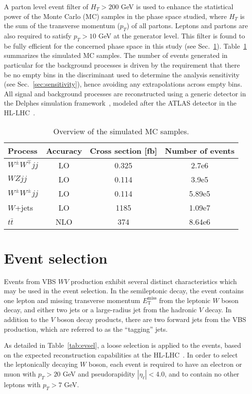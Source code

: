\documentclass[amsmath,amssymb,aps,prd,preprint,groupedaddress]{revtex4-2}
\newcommand*{\WpWmVBS}{\ensuremath{W^\pm W^\mp jj}}
\newcommand*{\ssWWVBS}{\ensuremath{W^\pm W^\pm jj}}
\newcommand*{\WZVBS}{\ensuremath{WZ jj}}
\newcommand*{\ttbar}{\ensuremath{t\bar{t}}}
\begin{document}
A parton level event filter of $H_T > 200$ GeV is used to enhance the statistical power of the Monte Carlo (MC) samples in the phase space studied, where $H_T$ is the sum of the transverse momentum ($p_T$) of all partons.
Leptons and partons are also required to satisfy $p_T > 10$ GeV at the generator level.
This filter is found to be fully efficient for the concerned phase space in this study (see Sec.~\ref{sec:evSel}).
Table~\ref{tab:mc} summarizes the simulated MC samples.
The number of events generated in particular for the background processes is driven by the requirement that there be 
no empty bins in the discriminant used to determine the analysis sensitivity (see Sec.~\ref{sec:sensitivity}), hence 
avoiding any extrapolations across empty bins.
All signal and background processes are reconstructed using a generic detector in the Delphes simulation framework~\cite{deFavereau:2013fsa},
modeled after the ATLAS detector in the HL-LHC~\cite{Azzi:2019yne}.


\begin{table}[ht]
\centering
\caption{Overview of the simulated MC samples.}
\label{tab:mc}
\begin{tabular}[t]{lccc}
\hline
Process & Accuracy & Cross section [fb] & Number of events \\
\hline
\WpWmVBS & LO & 0.325 & 2.7e6 \\
\WZVBS & LO & 0.114 & 3.9e5 \\
\ssWWVBS & LO & 0.114 & 5.89e5 \\
\hline
$W$+jets & LO & 1185 & 1.09e7 \\
\ttbar & NLO & 374 & 8.64e6 \\
\hline
\end{tabular}
\end{table} 
\section{Event selection}
\label{sec:evSel}
Events from VBS $WV$ production exhibit several distinct characteristics which may be used in the event selection.
In the semileptonic decay, the event contains one lepton and missing transverse momentum $E_{\text{T}}^{\text{miss}}$ from the leptonic $W$ boson decay, and either two jets or a large-radius jet from the hadronic $V$ decay. In addition to the $V$ boson decay products, there are two forward jets from the VBS production, which are referred to as the ``tagging'' jets.

As detailed in Table~\ref{tab:evsel}, a loose selection is applied to the events, based on the expected reconstruction capabilities at the HL-LHC~\cite{Atlas:2019qfx}. 
In order to select the leptonically decaying $W$ boson, each event is required to have an electron or muon with $p_T > 20$ GeV and pseudorapidity $|\eta_{\ell}|<$4.0, and to contain no other leptons with $p_{T} > 7$ GeV. 
\end{document}
